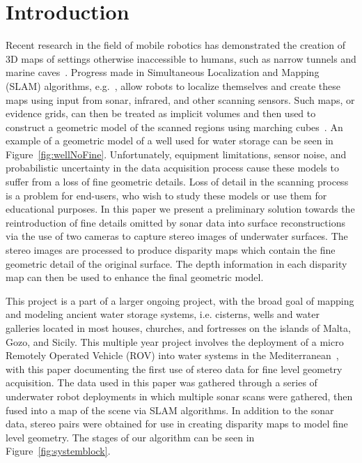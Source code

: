 \documentclass{llncs}
\begin{document}
\section{Introduction}
\noindent Recent research in the field of mobile robotics has demonstrated the creation of 3D maps of settings otherwise inaccessible to humans, such as narrow tunnels and marine caves~\cite{ICEX11,McVicker}. Progress made in Simultaneous Localization and Mapping (SLAM) algorithms, e.g.~\cite{Williams2000,harbor,Fairfield2006}, allow robots to localize themselves and create these maps using input from sonar, infrared, and other scanning sensors. Such maps, or evidence grids, can then be treated as implicit volumes and then used to construct a geometric model of the scanned regions using marching cubes~\cite{Lorensen}. An example of a geometric model of a well used for water storage can be seen in Figure~\ref{fig:wellNoFine}. Unfortunately, equipment limitations, sensor noise, and probabilistic uncertainty in the data acquisition process cause these models to suffer from a loss of fine geometric details. Loss of detail in the scanning process is a problem for end-users, who wish to study these models or use them for educational purposes. In this paper we present a preliminary solution towards the reintroduction of fine details omitted by sonar data into surface reconstructions via the use of two cameras to capture stereo images of underwater surfaces.  The stereo images are processed to produce disparity maps which contain the fine geometric detail of the original surface. The depth information in each disparity map can then be used to enhance the final geometric model.

This project is a part of a larger ongoing project, with the broad goal of mapping and modeling ancient water storage systems, i.e. cisterns, wells and water galleries located in most houses, churches, and fortresses on the islands of Malta, Gozo, and Sicily. This multiple year project involves the deployment of a micro Remotely Operated Vehicle (ROV) into water systems in the Mediterranean~\cite{White10,ICEX11,McVicker}, with this paper documenting the first use of stereo data for fine level geometry acquisition. The data used in this paper was gathered through a series of underwater robot deployments in which multiple sonar scans were gathered, then fused into a map of the scene via SLAM algorithms. In addition to the sonar data, stereo pairs were obtained for use in creating disparity maps to model fine level geometry. 
The stages of our algorithm can be seen in Figure~\ref{fig:systemblock}.
\end{document}
